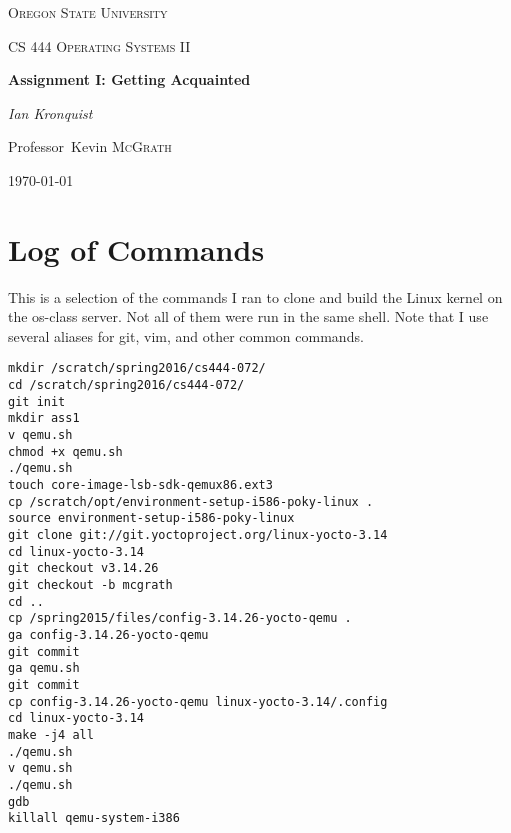 \documentclass[10pt,conference,draftclsnofoot,onecolumn]{IEEEtran}
\begin{document}
\begin{titlepage}
    \centering
    {\scshape\LARGE Oregon State University \par}
    \vspace{1cm}
    {\scshape\Large CS 444 Operating Systems II\par}
    \vspace{1.5cm}
    {\huge\bfseries Assignment I: Getting Acquainted\par}
    \vspace{2cm}
    {\Large\itshape Ian Kronquist\par}
    \vfill
    \par
    Professor~Kevin \textsc{McGrath}

    \vfill

    {\large \today\par}
\end{titlepage}


\author{
}


\begin{abstract}
In this project I compiled version 3.14.26 of the Linux kernel on a Centos
server and ran it in a virtual machine using qemu. Additionally, I completed a
project implementing a classic problem in the field of concurrency.
\end{abstract}

\bigskip
\bigskip
\bigskip

\section{Log of Commands}
This is a selection of the commands I ran to clone and build the Linux kernel
on the os-class server. Not all of them were run in the same shell.
Note that I use several aliases for git, vim, and other common commands.
\begin{verbatim}
mkdir /scratch/spring2016/cs444-072/
cd /scratch/spring2016/cs444-072/
git init
mkdir ass1
v qemu.sh
chmod +x qemu.sh
./qemu.sh
touch core-image-lsb-sdk-qemux86.ext3
cp /scratch/opt/environment-setup-i586-poky-linux .
source environment-setup-i586-poky-linux
git clone git://git.yoctoproject.org/linux-yocto-3.14
cd linux-yocto-3.14
git checkout v3.14.26
git checkout -b mcgrath
cd ..
cp /spring2015/files/config-3.14.26-yocto-qemu .
ga config-3.14.26-yocto-qemu
git commit
ga qemu.sh
git commit
cp config-3.14.26-yocto-qemu linux-yocto-3.14/.config
cd linux-yocto-3.14
make -j4 all
./qemu.sh
v qemu.sh
./qemu.sh
gdb
killall qemu-system-i386
\end{verbatim}
\end{document}
